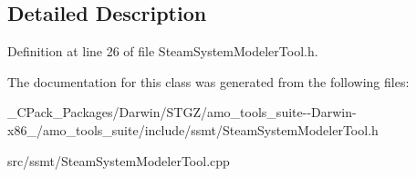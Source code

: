 \subsection{Detailed Description}


Definition at line 26 of file Steam\+System\+Modeler\+Tool.\+h.



The documentation for this class was generated from the following files\+:\begin{DoxyCompactItemize}
\item 
\+\_\+\+C\+Pack\+\_\+\+Packages/\+Darwin/\+S\+T\+G\+Z/amo\+\_\+tools\+\_\+suite-\/-\/\+Darwin-\/x86\+\_/amo\+\_\+tools\+\_\+suite/include/ssmt/Steam\+System\+Modeler\+Tool.\+h\item 
src/ssmt/Steam\+System\+Modeler\+Tool.\+cpp\end{DoxyCompactItemize}
